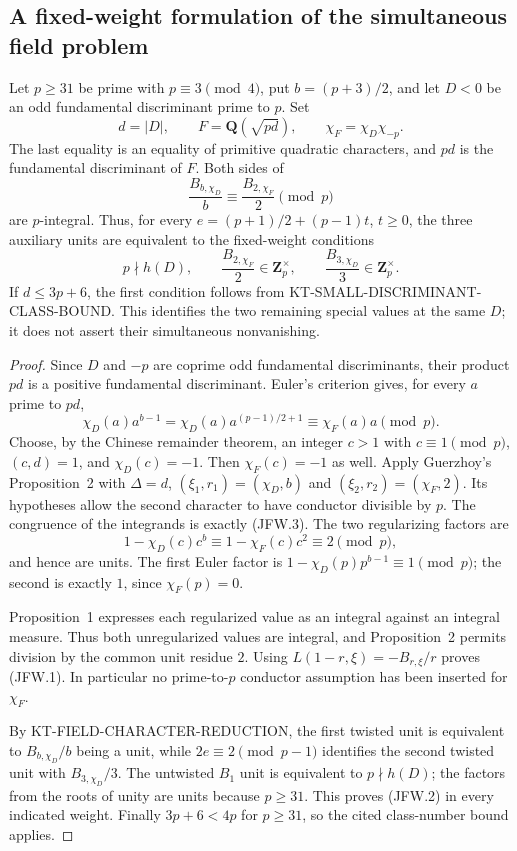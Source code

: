 \subsection{A fixed-weight formulation of the simultaneous field problem}

\begin{proposition}
Let $p\ge31$ be prime with $p\equiv3\pmod4$, put
$b=(p+3)/2$, and let $D<0$ be an odd fundamental discriminant
prime to $p$.  Set
\[
 d=|D|,\qquad F=\mathbf Q(\sqrt{pd}),\qquad
 \chi_F=\chi_D\chi_{-p}.
\]
The last equality is an equality of primitive quadratic characters,
and $pd$ is the fundamental discriminant of $F$.  Both sides of
\[
 \frac{B_{b,\chi_D}}b\equiv\frac{B_{2,\chi_F}}2\pmod p
                                                        \tag{JFW.1}
\]
are $p$-integral.  Thus, for every
$e=(p+1)/2+(p-1)t$, $t\ge0$, the three auxiliary units are
equivalent to the fixed-weight conditions
\[
 p\nmid h(D),\qquad
 \frac{B_{2,\chi_F}}2\in\mathbf Z_p^\times,\qquad
 \frac{B_{3,\chi_D}}3\in\mathbf Z_p^\times.              \tag{JFW.2}
\]
If $d\le3p+6$, the first condition follows from
KT-SMALL-DISCRIMINANT-CLASS-BOUND.  This identifies the two
remaining special values at the same $D$; it does not assert their
simultaneous nonvanishing.
\end{proposition}

\begin{proof}
Since $D$ and $-p$ are coprime odd fundamental discriminants,
their product $pd$ is a positive fundamental discriminant.  Euler's
criterion gives, for every $a$ prime to $pd$,
\[
 \chi_D(a)a^{b-1}
 =\chi_D(a)a^{(p-1)/2+1}
 \equiv\chi_F(a)a\pmod p.                              \tag{JFW.3}
\]
Choose, by the Chinese remainder theorem, an integer $c>1$ with
$c\equiv1\pmod p$, $(c,d)=1$, and $\chi_D(c)=-1$.
Then $\chi_F(c)=-1$ as well.  Apply Guerzhoy's Proposition~2
with $\Delta=d$, $(\xi_1,r_1)=(\chi_D,b)$ and
$(\xi_2,r_2)=(\chi_F,2)$.  Its hypotheses allow the second
character to have conductor divisible by $p$.
The congruence of the integrands is exactly (JFW.3).  The two
regularizing factors are
\[
 1-\chi_D(c)c^b\equiv
 1-\chi_F(c)c^2\equiv2\pmod p,
\]
and hence are units.  The first Euler factor is
$1-\chi_D(p)p^{b-1}\equiv1\pmod p$; the second is exactly
$1$, since $\chi_F(p)=0$.

Proposition~1 expresses each regularized value as an integral
against an integral measure.  Thus both unregularized values
are integral, and Proposition~2 permits division by the common
unit residue $2$.  Using $L(1-r,\xi)=-B_{r,\xi}/r$ proves
(JFW.1).  In particular no prime-to-$p$ conductor assumption has
been inserted for $\chi_F$.

By KT-FIELD-CHARACTER-REDUCTION, the first twisted unit is
equivalent to $B_{b,\chi_D}/b$ being a unit, while
$2e\equiv2\pmod{p-1}$ identifies the second twisted unit
with $B_{3,\chi_D}/3$.  The untwisted $B_1$ unit is
equivalent to $p\nmid h(D)$; the factors from the roots of
unity are units because $p\ge31$.  This proves (JFW.2) in
every indicated weight.  Finally $3p+6<4p$ for $p\ge31$,
so the cited class-number bound applies.
\end{proof}

